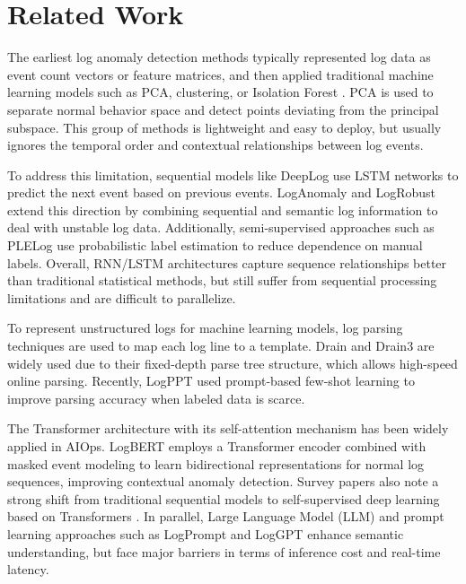 \documentclass[conference]{IEEEtran}
\begin{document}
\section{Related Work}
The earliest log anomaly detection methods typically represented log data as event count vectors or feature matrices, and then applied traditional machine learning models such as PCA, clustering, or Isolation Forest \cite{b10,b11}. PCA is used to separate normal behavior space and detect points deviating from the principal subspace. This group of methods is lightweight and easy to deploy, but usually ignores the temporal order and contextual relationships between log events.

To address this limitation, sequential models like DeepLog \cite{b1} use LSTM networks to predict the next event based on previous events. LogAnomaly \cite{b13} and LogRobust \cite{b14} extend this direction by combining sequential and semantic log information to deal with unstable log data. Additionally, semi-supervised approaches such as PLELog \cite{b15} use probabilistic label estimation to reduce dependence on manual labels. Overall, RNN/LSTM architectures capture sequence relationships better than traditional statistical methods, but still suffer from sequential processing limitations and are difficult to parallelize.

To represent unstructured logs for machine learning models, log parsing techniques are used to map each log line to a template. Drain \cite{b3} and Drain3 are widely used due to their fixed-depth parse tree structure, which allows high-speed online parsing. Recently, LogPPT \cite{b7} used prompt-based few-shot learning to improve parsing accuracy when labeled data is scarce.

The Transformer architecture with its self-attention mechanism \cite{b4} has been widely applied in AIOps. LogBERT \cite{b2} employs a Transformer encoder combined with masked event modeling to learn bidirectional representations for normal log sequences, improving contextual anomaly detection. Survey papers also note a strong shift from traditional sequential models to self-supervised deep learning based on Transformers \cite{b16}. In parallel, Large Language Model (LLM) and prompt learning approaches such as LogPrompt \cite{b8} and LogGPT \cite{b9} enhance semantic understanding, but face major barriers in terms of inference cost and real-time latency.
\end{document}
